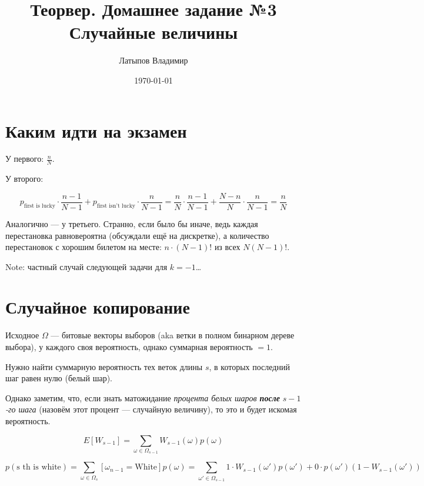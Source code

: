 \documentclass[12pt, a4paper]{article}
\title{Теорвер. Домашнее задание №3 \\ \large Случайные величины}
\author{
  Латыпов Владимир
}
\date{\today}
\begin{document}
\maketitle


\section{Каким идти на экзамен}

У первого: $\frac{n}{N}$.

У второго: 

\begin{equation}
  p_{\text{first is lucky}} \cdot \frac{n - 1}{N - 1} + p_{\text{first isn't lucky}} \cdot \frac{n}{N - 1} =
  \frac{n}{N} \cdot \frac{n - 1}{N - 1} + \frac{N - n}{N} \cdot \frac{n}{N - 1} = \frac{n}{N}
\end{equation}

Аналогично — у третьего. Странно, если было бы иначе, ведь каждая перестановка равновероятна (обсуждали ещё на дискретке),
а количество перестановок с хорошим билетом на месте: $n \cdot (N - 1)!$ из всех $N (N - 1)!$.

Note: частный случай следующей задачи для $k = -1$…

\section{Случайное копирование}

Исходное $\Omega$ — битовые векторы выборов (aka ветки в полном бинарном дереве выбора), у каждого своя вероятность, однако суммарная вероятность $= 1$.

Нужно найти суммарную вероятность тех веток длины $s$, в которых последний шаг равен нулю (белый шар).

Однако заметим, что, если знать матожидание \textit{процента белых шаров \textbf{после}} $s - 1$\textit{-го шага} (назовём этот процент — случайную величину), то это и будет искомая вероятность.

\begin{equation}
  E[W_{s - 1}] = \sum_{\omega \in \Omega_{s - 1}} W_{s - 1}(\omega) p(\omega)
\end{equation}


\begin{equation}
  p(\text{s th is white}) = \sum_{\omega \in \Omega_{s}} [\omega_{n - 1} = \text{White}] p(\omega)  = \sum_{\omega' \in \Omega_{s - 1}} 1 \cdot W_{s - 1}(\omega') p(\omega') + 0 \cdot p(\omega') (1 - W_{s - 1}(\omega'))
\end{equation}
\end{document}
